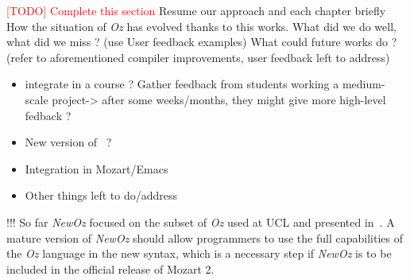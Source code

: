 \textcolor{red}{[TODO] Complete this section}
Resume our approach and each chapter briefly
How the situation of \textit{Oz} has evolved thanks to this works.\newline
What did we do well, what did we miss ? (use User feedback examples)\newline
What could future works do ? (refer to aforementioned compiler improvements, user feedback left to address)\newline
\begin{itemize}
    \item integrate in a course ? Gather feedback from students working a medium-scale project-> after some weeks/months, they might give more high-level fedback ?
    \item New version of~\cite{van2004concepts} ?
    \item Integration in Mozart/Emacs
    \item Other things left to do/address
\end{itemize}

!!! So far \textit{NewOz} focused on the subset of \textit{Oz} used at UCL and presented in~\cite{van2004concepts}.
A mature version of \textit{NewOz} should allow programmers to use the full capabilities of the \textit{Oz} language in the new syntax, which is a necessary step if \textit{NewOz} is to be included in the official release of Mozart 2.